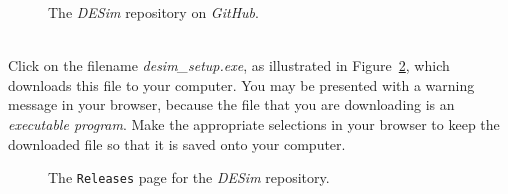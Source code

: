 \documentclass[epsfig,10pt,fullpage]{article} \addtolength{\textwidth}{1.5in}
\begin{document}
\begin{figure}[h]
	\begin{center}
        \setlength{\fboxsep}{0pt}
	\end{center}
          \caption{The {\it DESim} repository on {\it GitHub}.}
	\label{fig:github}
\end{figure}

\newpage
~\\
\noindent
Click on the filename {\it desim\_setup.exe}, as illustrated in Figure~\ref{fig:release},
which downloads this file to your computer. You may be presented with a
warning message in your browser, because the file that you are downloading is an 
{\it executable program}. Make the appropriate selections in your browser to keep the downloaded
file so that it is saved onto your computer.

\begin{figure}[h]
	\begin{center}
        \setlength{\fboxsep}{0pt}
	\end{center}
          \caption{The \texttt{Releases} page for the {\it DESim} repository.}
	\label{fig:release}
\end{figure}
\end{document}
